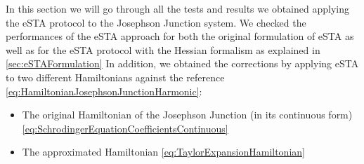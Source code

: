 In this section we will go through all the tests and results we obtained applying the eSTA protocol to the Josephson Junction system.
We checked the performances of the eSTA approach for both the original formulation of eSTA as well as for the eSTA protocol with the Hessian formalism as explained in \cref{sec:eSTAFormulation}
In addition, we obtained the corrections by applying eSTA to two different Hamiltonians against the reference \cref{eq:HamiltonianJosephsonJunctionHarmonic}:
\begin{itemize}
    \item The original Hamiltonian of the Josephson Junction (in its continuous form) \cref{eq:SchrodingerEquationCoefficientsContinuous}
    \item The approximated Hamiltonian \cref{eq:TaylorExpansionHamiltonian}
\end{itemize}
